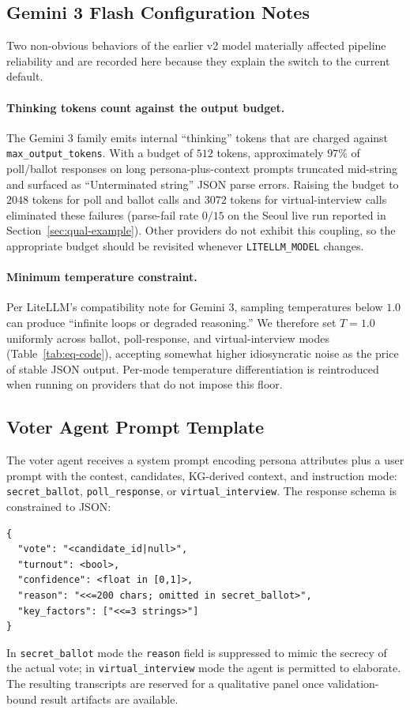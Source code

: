 \documentclass[11pt]{article}
\begin{document}
\subsection{Gemini 3 Flash Configuration Notes}
\label{app:gemini3-config}

Two non-obvious behaviors of the earlier v2 model  materially affected pipeline reliability and are recorded here because they explain the switch to the current  default.

\paragraph{Thinking tokens count against the output budget.}
The Gemini 3 family emits internal ``thinking'' tokens that are charged against \texttt{max\_output\_tokens}. With a budget of $512$ tokens, approximately $97\%$ of poll/ballot responses on long persona-plus-context prompts truncated mid-string and surfaced as ``Unterminated string'' JSON parse errors. Raising the budget to $2048$ tokens for poll and ballot calls and $3072$ tokens for virtual-interview calls eliminated these failures (parse-fail rate $0/15$ on the Seoul live run reported in Section~\ref{sec:qual-example}). Other providers do not exhibit this coupling, so the appropriate budget should be revisited whenever \texttt{LITELLM\_MODEL} changes.

\paragraph{Minimum temperature constraint.}
Per LiteLLM's compatibility note for Gemini 3, sampling temperatures below $1.0$ can produce ``infinite loops or degraded reasoning.'' We therefore set $T = 1.0$ uniformly across ballot, poll-response, and virtual-interview modes (Table~\ref{tab:eq-code}), accepting somewhat higher idiosyncratic noise as the price of stable JSON output. Per-mode temperature differentiation is reintroduced when running on providers that do not impose this floor.

\subsection{Voter Agent Prompt Template}

The voter agent receives a system prompt encoding persona attributes plus a user prompt with the contest, candidates, KG-derived context, and instruction mode: \texttt{secret\_ballot}, \texttt{poll\_response}, or \texttt{virtual\_interview}. The response schema is constrained to JSON:
\begin{verbatim}
{
  "vote": "<candidate_id|null>",
  "turnout": <bool>,
  "confidence": <float in [0,1]>,
  "reason": "<<=200 chars; omitted in secret_ballot>",
  "key_factors": ["<<=3 strings>"]
}
\end{verbatim}
In \texttt{secret\_ballot} mode the \texttt{reason} field is suppressed to mimic the secrecy of the actual vote; in \texttt{virtual\_interview} mode the agent is permitted to elaborate. The resulting transcripts are reserved for a qualitative panel once validation-bound result artifacts are available.
\end{document}
